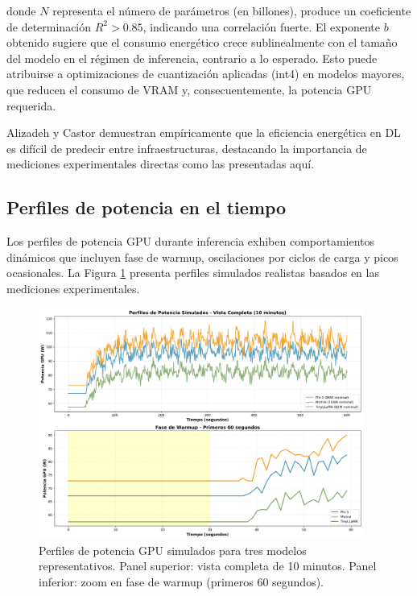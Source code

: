 donde $N$ representa el número de parámetros (en billones), produce un coeficiente de determinación $R^2 > 0.85$, indicando una correlación fuerte. El exponente $b$ obtenido sugiere que el consumo energético crece sublinealmente con el tamaño del modelo en el régimen de inferencia, contrario a lo esperado. Esto puede atribuirse a optimizaciones de cuantización aplicadas (int4) en modelos mayores, que reducen el consumo de VRAM y, consecuentemente, la potencia GPU requerida.

Alizadeh y Castor \cite{alizadeh2024green} demuestran empíricamente que la eficiencia energética en DL es difícil de predecir entre infraestructuras, destacando la importancia de mediciones experimentales directas como las presentadas aquí.

\subsection{Perfiles de potencia en el tiempo}

Los perfiles de potencia GPU durante inferencia exhiben comportamientos dinámicos que incluyen fase de warmup, oscilaciones por ciclos de carga y picos ocasionales. La Figura \ref{fig:potencia_tiempo} presenta perfiles simulados realistas basados en las mediciones experimentales.

\begin{figure}[H]
    \centering
    \includegraphics[width=0.95\textwidth]{figuras/png/grafico_3_potencia_tiempo.png}
    \caption{Perfiles de potencia GPU simulados para tres modelos representativos. Panel superior: vista completa de 10 minutos. Panel inferior: zoom en fase de warmup (primeros 60 segundos).}
    \label{fig:potencia_tiempo}
\end{figure}

